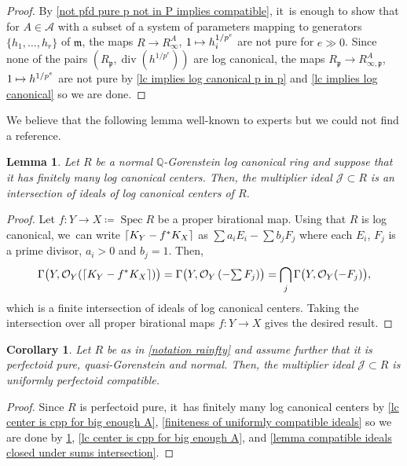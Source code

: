 \documentclass[JEP,XML,SOM,Unicode,published]{cedram}
\let\autoref\cref
\newcommand\mto{\mathchoice{\longmapsto}{\mapsto}{\mapsto}{\mapsto}}
\theoremstyle{plain}
\newtheorem{corollary}[theorem]{Corollary}
\newtheorem{lemma}[theorem]{Lemma}
\theoremstyle{definition}
\numberwithin{equation}{theorem}
\newcommand{\Q}{\mathbb {Q}}
\newcommand{\fram}{\mathfrak{m}}
\newcommand{\p}{\mathfrak{p}}
\DeclareMathOperator{\Div}{{div}}
\DeclareMathOperator{\Spec}{{Spec}}
\DeclarePairedDelimiter\ceil{\lceil}{\rceil}
\newcommand{\sA}{\mathcal{A}}
\newcommand{\sJ}{\mathcal{J}}
\newcommand{\sO}{\mathcal{O}}
\newcommand{\unpe}{{1/{p^e}}}
\begin{document}
\begin{proof}
By \autoref{not pfd pure p not in P implies compatible}, it~is enough to show that for $A\in \sA$ with a subset of a system of parameters mapping to generators $\{h_1,\ldots,h_r\}$ of $\fram$, the maps $R\to R^A_{\infty}$, $1\mto h_i^\unpe$ are not pure for $e\gg 0$. Since none of the pairs $(R_\p, \Div(h^{\unpe}))$ are log canonical, the maps $R_\p\to R^A_{\infty,\p}$, $1\mto h^\unpe$ are not pure by \autoref{lc implies log canonical p in p} and \autoref{lc implies log canonical} so we are done.
\end{proof}

We believe that the following lemma well-known to experts but we could not find a reference.
\begin{lemma}\label{multiplier ideal is intersection lc centers}
Let $R$ be a normal $\Q$-Gorenstein log canonical ring and suppose that it has finitely many log canonical centers. Then, the multiplier ideal $\sJ\subset R$ is an intersection of ideals of log canonical centers of $R$.
\end{lemma}

\begin{proof}
Let $f\colon Y\to X\coloneqq \Spec R$ be a proper birational map. Using that $R$ is log canonical, we~can write $\ceil{K_Y-f^* K_X}$ as $\sum a_i E_i - \sum b_j F_j$ where each $E_i$, $F_j$ is a prime divisor,
$a_i>0$ and $b_j=1$. Then,
\[\Gamma\bigl(Y,\sO_Y(\ceil{K_Y-f^* K_X})\bigr)=\Gamma\bigl(Y,\sO_Y\left( - {\textstyle\sum F_j}\right)\bigr)=\bigcap_j \Gamma\bigl(Y,\sO_Y( - F_j)\bigl),
\]
which is a finite intersection of ideals of log canonical centers. Taking the intersection over all proper birational maps $f\colon Y\to X$ gives the desired result.
\end{proof}

\begin{corollary}\label{multiplier ideal uniformly compatible}
Let $R$ be as in \autoref{notation rainfty} and assume further that it is perfectoid pure, quasi-Gorenstein and normal. Then, the multiplier ideal $\sJ\subset R$ is uniformly perfectoid compatible.
\end{corollary}

\begin{proof}
Since $R$ is perfectoid pure, it~has finitely many log canonical centers by \autoref{lc center is cpp for big enough A}, \autoref{finiteness of uniformly compatible ideals} so we are done by \autoref{multiplier ideal is intersection lc centers}, \autoref{lc center is cpp for big enough A}, and \autoref{lemma compatible ideals closed under sums intersection}.
\end{proof}
\end{document}
